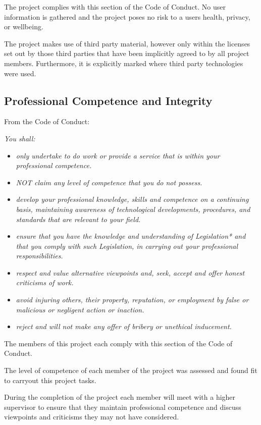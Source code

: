\documentclass[a4paper]{report}
\begin{document}
The project complies with this section of the Code of Conduct. No user information is gathered and the project poses no risk to a users health, privacy, or wellbeing.

The project makes use of third party material, however only within the licenses set out by those third parties that have been implicitly agreed to by all project members. Furthermore, it is explicitly marked where third party technologies were used.


\subsection*{Professional Competence and Integrity}

From the Code of Conduct: \cite{CoC}

\textit{You shall:}
\begin{itemize}
\item \textit{only undertake to do work or provide a service that is within your professional competence.}
\item \textit{NOT claim any level of competence that you do not possess.}
\item \textit{develop your professional knowledge, skills and competence on a continuing basis, maintaining awareness of technological developments, procedures, and standards that are relevant to your field.}
\item \textit{ensure that you have the knowledge and understanding of Legislation* and that you comply with such Legislation, in carrying out your professional responsibilities. }
\item \textit{respect and value alternative viewpoints and, seek, accept and offer honest criticisms of work.}
\item \textit{avoid injuring others, their property, reputation, or employment by false or malicious or negligent action or inaction.}
\item \textit{reject and will not make any offer of bribery or unethical inducement.}
\end{itemize}

The members of this project each comply with this section of the Code of Conduct.

The level of competence of each member of the project was assessed and found fit to carryout this project tasks.

During the completion of the project each member will meet with a higher supervisor to ensure that they maintain professional competence and discuss viewpoints and criticisms they may not have considered.
\end{document}
